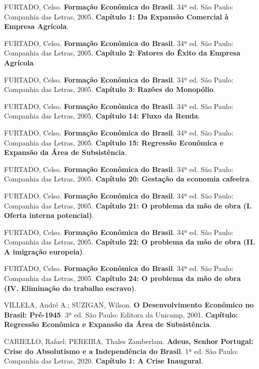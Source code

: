 \documentclass[a4paper,12pt]{article}[abntex2]
\begin{document}
\begin{thebibliography}{99}

FURTADO, Celso. \textbf{Formação Econômica do Brasil}. 34ª ed. São Paulo: Companhia das Letras, 2005.
\textbf{Capítulo 1: Da Expansão Comercial à Empresa Agrícola}.

FURTADO, Celso. \textbf{Formação Econômica do Brasil}. 34ª ed. São Paulo: Companhia das Letras, 2005.
\textbf{Capítulo 2: Fatores do Êxito da Empresa Agrícola}.

FURTADO, Celso. \textbf{Formação Econômica do Brasil}. 34ª ed. São Paulo: Companhia das Letras, 2005.
\textbf{Capítulo 3: Razões do Monopólio}.

FURTADO, Celso. \textbf{Formação Econômica do Brasil}. 34ª ed. São Paulo: Companhia das Letras, 2005.
\textbf{Capítulo 14: Fluxo da Renda}.

FURTADO, Celso. \textbf{Formação Econômica do Brasil}. 34ª ed. São Paulo: Companhia das Letras, 2005.
\textbf{Capítulo 15: Regressão Econômica e Expansão da Área de Subsistência}.

FURTADO, Celso. \textbf{Formação Econômica do Brasil}. 34ª ed. São Paulo: Companhia das Letras, 2005.
\textbf{Capítulo 20: Gestação da economia cafeeira}.

FURTADO, Celso. \textbf{Formação Econômica do Brasil}. 34ª ed. São Paulo: Companhia das Letras, 2005.
\textbf{Capítulo 21: O problema da mão de obra (I. Oferta interna potencial)}.

FURTADO, Celso. \textbf{Formação Econômica do Brasil}. 34ª ed. São Paulo: Companhia das Letras, 2005.
\textbf{Capítulo 22: O problema da mão de obra (II. A imigração europeia)}.

FURTADO, Celso. \textbf{Formação Econômica do Brasil}. 34ª ed. São Paulo: Companhia das Letras, 2005.
\textbf{Capítulo 24: O problema da mão de obra (IV. Eliminação do trabalho escravo)}.

VILLELA, André A.; SUZIGAN, Wilson. \textbf{O Desenvolvimento Econômico no Brasil: Pré-1945}. 3ª ed. São Paulo: Editora da Unicamp, 2001.
\textbf{Capítulo: Regressão Econômica e Expansão da Área de Subsistência}.

CARIELLO, Rafael; PEREIRA, Thales Zamberlam. \textbf{Adeus, Senhor Portugal: Crise do Absolutismo e a Independência do Brasil}. 1ª ed. São Paulo: Companhia das Letras, 2020.
\textbf{Capítulo 1: A Crise Inaugural}.


\end{thebibliography}
\end{document}
